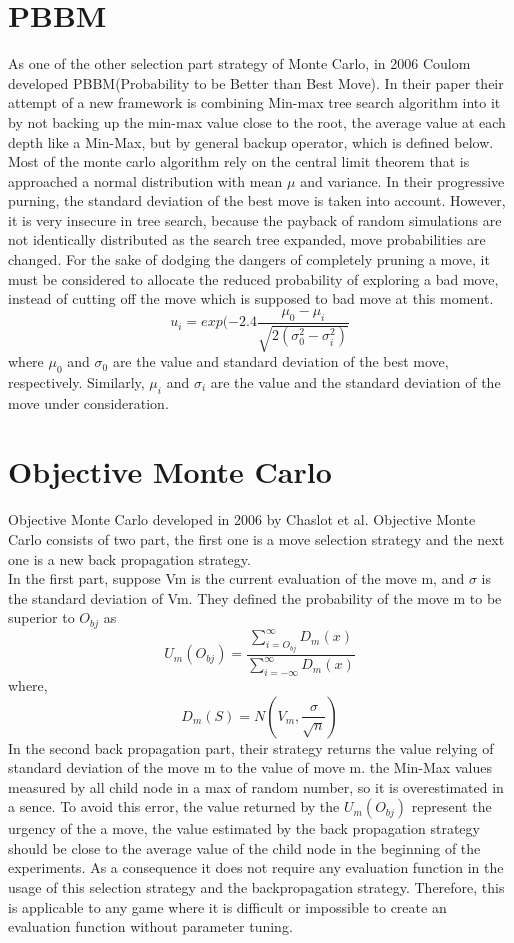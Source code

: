 \documentclass[11pt]{article}
\begin{document}
\section{PBBM}
As one of the other selection part strategy of Monte Carlo, in 2006 Coulom developed PBBM(Probability to be Better than Best Move)\cite{coulom2006efficient}. In their paper their attempt of a new framework is combining Min-max tree search algorithm into it by not backing up the min-max value close to the root, the average value at each depth like a Min-Max, but by general backup operator, which is defined below. 
Most of the monte carlo algorithm rely on the central limit theorem that is approached a normal distribution with mean \(\mu\) and variance. In their progressive purning, the standard deviation of the best move is taken into account. However, it is very insecure in tree search, because the payback of random simulations are not identically distributed as the search tree expanded, move probabilities are changed. For the sake of dodging the dangers of completely pruning a move, it must be considered to allocate the reduced probability of exploring a bad move, instead of cutting off the move which is supposed to bad move at this moment.   
\[u_{i} = exp(-2.4\frac{\mu_{0} - \mu_{i}}{\sqrt{2(\sigma^2_{0} - \sigma^2_{i})}}\]
where \(\mu_{0}\) and \(\sigma_{0}\) are the value and standard deviation of the best move, respectively. Similarly, \(\mu_{i}\) and \(\sigma_{i}\) are the value and the standard deviation of the move under consideration.
\section{Objective Monte Carlo}
Objective Monte Carlo developed in 2006 by Chaslot et al\cite{chaslot2006monte}. Objective Monte Carlo consists of two part, the first one is a move selection strategy and the next one is a new back propagation strategy. \\
In the first part, suppose Vm is the current evaluation of the move m, and \(\sigma\) is the standard deviation of Vm. They defined the probability of the move m to be superior to \(O_{bj}\) as 
\[U_{m}(O_{bj}) = \frac{\sum_{i=O_{bj}}^{\infty} D_{m}(x)}{\sum_{i=-\infty}^{\infty} D_{m}(x)}\]
where, \[D_{m}(S) = N(V_{m}, \frac{\sigma}{\sqrt n}) \]
In the second back propagation part, their strategy returns the value relying of standard deviation of the move m to the value of move m. the Min-Max values measured by all child node in a max of random number, so it is overestimated in a sence. To avoid this error, the value returned by the 
\(U_{m}(O_{bj})\) represent the urgency of the a move, the value estimated by the back propagation strategy should be close to the average value of the child node in the beginning of the experiments.
As a consequence it does not require any evaluation function in the usage of this selection strategy and the backpropagation strategy. Therefore, this is applicable to any game where it is difficult or impossible  to create an evaluation function without parameter tuning.
\end{document}
